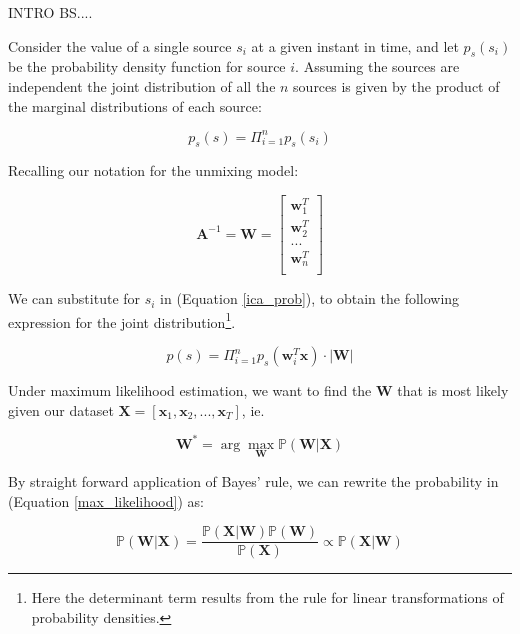 \documentclass[11pt, oneside, a4paper]{report}
\begin{document}
INTRO BS....

Consider the value of a single source $s_i$ at a given instant in time, and
let $p_s(s_i)$ be the probability density function for source $i$. Assuming the 
sources are independent the joint distribution of all the $n$ sources is given 
by the product of the marginal distributions of each source:

\begin{equation}
  p_s(s) = \Pi_{i=1}^n p_s(s_i)
  \label{ica_prob}
\end{equation}

Recalling our notation for the unmixing model:

\begin{equation}
  \boldsymbol{A}^{-1} = \boldsymbol{W} = 
  \begin{bmatrix} 
    \boldsymbol{w}_1^T\\ \boldsymbol{w}_2^T\\ ...\\ \boldsymbol{w}_n^T\\
  \end{bmatrix}
\end{equation}

We can substitute for $s_i$ in (Equation \ref{ica_prob}), to obtain the following
expression for the joint distribution\footnote{Here the determinant term results from
the rule for linear transformations of probability densities.}.

\begin{equation}
    p(s) = \Pi_{i=1}^n p_s(\boldsymbol{w}_i^T \boldsymbol{x}) \cdot |\boldsymbol{W}|    
\end{equation}


Under maximum likelihood estimation, we want to find the $\boldsymbol{W}$ that is most likely given our 
dataset $\boldsymbol{X} = [\boldsymbol{x}_1,\boldsymbol{x}_2,...,\boldsymbol{x}_T]$, ie.


\begin{equation}
  \label{max_likelihood}
  \boldsymbol{W}^* = \arg \max_{\boldsymbol{W}} \mathbb{P}(\boldsymbol{W}|\boldsymbol{X})
\end{equation}

By straight forward application of Bayes' rule, we can rewrite the probability in (Equation \ref{max_likelihood}) as:

\begin{equation}
  \label{bayes}
  \mathbb{P}(\boldsymbol{W}|\boldsymbol{X}) 
  = \frac{\mathbb{P}(\boldsymbol{X}|\boldsymbol{W}) \mathbb{P}(\boldsymbol{W})}{\mathbb{P}(\boldsymbol{X})}
  \propto \mathbb{P}(\boldsymbol{X}|\boldsymbol{W})
\end{equation}
\end{document}

